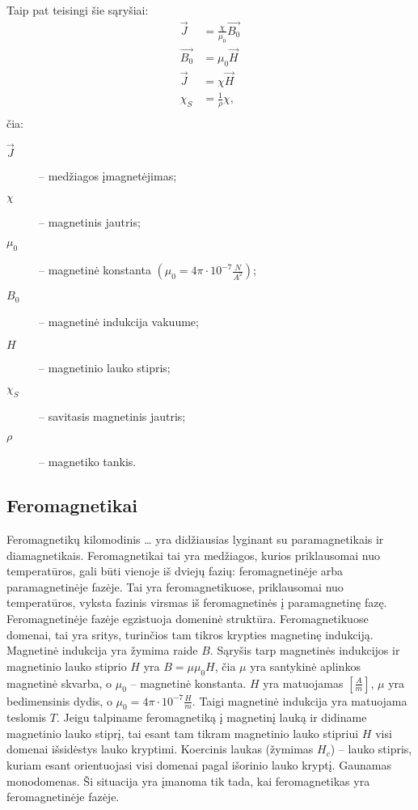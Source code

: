Taip pat teisingi šie sąryšiai:
\begin{align*}
  \vec{J} &= \frac{\chi}{\mu_{0}} \vec{B_{0}} \\
  \vec{B_{0}} &= \mu_{0}\vec{H} \\
  \vec{J} &= \chi \vec{H} \\
  \chi_{S} &= \frac{1}{\rho}\chi, \\
\end{align*}
čia:
\begin{description}
  \item[$\vec{J}$] – medžiagos įmagnetėjimas;
  \item[$\chi$] – magnetinis jautris;
  \item[$\mu_{0}$] – magnetinė konstanta
    $(\mu_{0} = 4\pi\cdot10^{-7}\frac{N}{A^{2}})$;
  \item[$B_{0}$] – magnetinė indukcija vakuume;
  \item[$H$] – magnetinio lauko stipris;
  \item[$\chi_{S}$] – savitasis magnetinis jautris;
  \item[$\rho$] – magnetiko tankis.
\end{description}

\subsection{Feromagnetikai}

Feromagnetikų kilomodinis … yra didžiausias lyginant su
paramagnetikais ir diamagnetikais. Feromagnetikai tai yra medžiagos,
kurios priklausomai nuo temperatūros, gali būti vienoje iš dviejų
fazių: feromagnetinėje arba paramagnetinėje fazėje. Tai yra
feromagnetikuose, priklausomai nuo temperatūros, vyksta fazinis virsmas
iš feromagnetinės į paramagnetinę fazę. Feromagnetinėje fazėje
egzistuoja domeninė struktūra. Feromagnetikuose domenai, tai yra
sritys, turinčios tam tikros krypties magnetinę indukciją.
Magnetinė indukcija yra žymima raide $B$. Sąryšis tarp magnetinės
indukcijos ir magnetinio lauko stiprio $H$ yra $B = \mu\mu_{0}H$,
čia $\mu$ yra santykinė aplinkos magnetinė skvarba, o
$\mu_{0}$ – magnetinė konstanta. $H$ yra matuojamas
$\left[ \frac{A}{m} \right]$, $\mu$ yra bedimensinis dydis, o
$\mu_{0} = 4 \pi \cdot 10 ^{-7}\frac{H}{m}$. Taigi
magnetinė indukcija yra matuojama teslomis $T$. Jeigu talpiname
feromagnetiką į magnetinį lauką ir didiname magnetinio lauko stiprį,
tai esant tam tikram magnetinio lauko stipriui $H$ visi domenai išsidėstys
lauko kryptimi. Koercinis laukas (žymimas $H_{c}$) – lauko stipris,
kuriam esant orientuojasi visi domenai pagal išorinio lauko kryptį.
Gaunamas monodomenas. Ši situacija yra įmanoma tik tada, kai
feromagnetikas yra feromagnetinėje fazėje.

